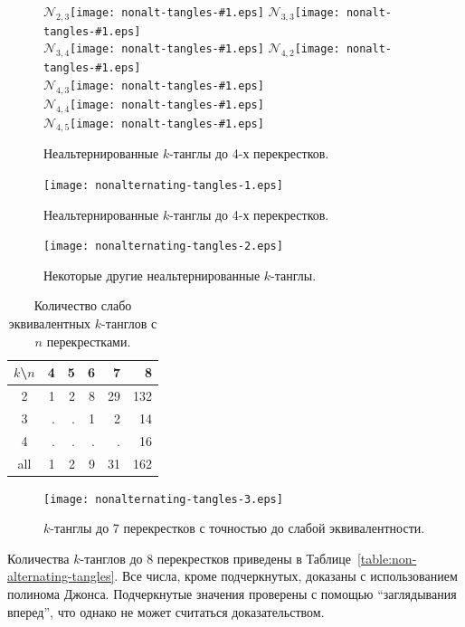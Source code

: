 \documentclass[12pt]{article}
\theoremstyle{plain}
\theoremstyle{definition}
\begin{document}
		\begin{figure}[ht]
			\centering
			\def\pic#1{\hbox{\protect\texttt{[image: nonalt-tangles-\#1.eps]}}}
			$\mathcal N_{2,3}$\pic{23} \qquad $\mathcal N_{3,3}$\pic{33} \\
			$\mathcal N_{3,4}$\pic{34} \qquad $\mathcal N_{4,2}$\pic{42} \\
			$\mathcal N_{4,3}$\pic{43} \\
			$\mathcal N_{4,4}$\pic{44} \\
			$\mathcal N_{4,5}$\pic{45}
			\caption{\footnotesize Неальтернированные $k$-танглы до 4-х перекрестков.}
		\end{figure}


		\begin{figure}[ht]
			\centering
			\texttt{[image: nonalternating-tangles-1.eps]}
			\caption{\footnotesize Неальтернированные $k$-танглы до 4-х перекрестков.\label{figure:nonalternating-tangles-4}}
		\end{figure}

		\begin{figure}[ht]
			\centering
			\texttt{[image: nonalternating-tangles-2.eps]}
			\caption{\footnotesize Некоторые другие неальтернированные $k$-танглы.\label{figure:nonalternating-tangles-rest}}
		\end{figure}

		\begin{table}[ht]
			\caption{Количество слабо эквивалентных $k$-танглов с $n$ перекрестками.\label{table:weak-tangles}}
			\centering
			\begin{tabular}{|c||r|r|r|r|r|}
			\hline
			$k$\textbackslash $n$
			    & 4 & 5 & 6 &  7 &   8 \\
			\hline\hline
			2   & 1 & 2 & 8 & 29 & 132 \\
			3   & . & . & 1 &  2 &  14 \\
			4   & . & . & . &  . &  16 \\
			\hline
			all & 1 & 2 & 9 & 31 & 162 \\
			\hline
			\end{tabular}
		\end{table}

		\begin{figure}[ht]
			\centering
			\texttt{[image: nonalternating-tangles-3.eps]}
			\caption{\footnotesize $k$-танглы до 7 перекрестков с точностью до слабой эквивалентности.\label{figure:weak-tangles-7}}
		\end{figure}

		Количества $k$-танглов до 8 перекрестков приведены в Таблице~\ref{table:non-alternating-tangles}. Все числа, кроме подчеркнутых,
		доказаны с использованием полинома Джонса. Подчеркнутые значения проверены с помощью ``заглядывания вперед'', что однако не
		может считаться доказательством.
\end{document}
